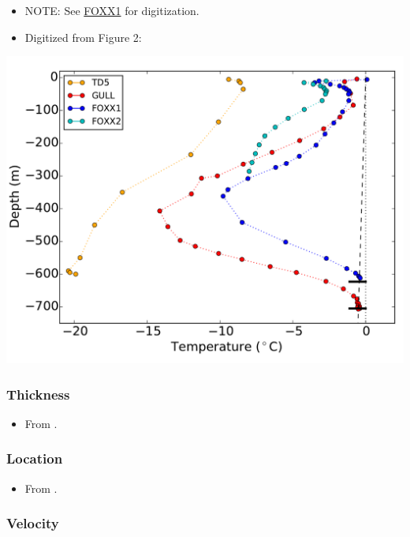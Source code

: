 \documentclass[article,a4paper,times,11pt,twoside]{article}
\begin{document}
\begin{itemize}
\item NOTE: See \href{gull/foxx1/README.org}{FOXX1} for digitization.
\item Digitized from \textcite{luthi_2015} Figure 2:
\end{itemize}

\begin{center}
\includegraphics[width=.9\linewidth]{gull/luthi_2015_fig2_all.png}
\end{center}


\subsubsection{Thickness}
\label{sec:org6076453}

\begin{itemize}
\item From \textcite{ryser_2014_caterpillar}.
\end{itemize}

\subsubsection{Location}
\label{sec:org75db48e}

\begin{itemize}
\item From \textcite{ryser_2014_caterpillar}.
\end{itemize}

\subsubsection{Velocity}
\label{sec:org0300c4a}
\end{document}
